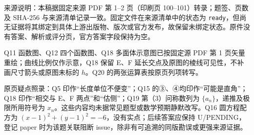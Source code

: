 

\begin{gktip}
来源说明：本稿据固定来源 PDF 第 1–2 页（印刷页 100–101）转录；题签、页数及 SHA-256 与来源清单记录一致。固定文件在来源清单中的状态为 \texttt{ready}，但尚无证据将其绑定到具体上游出版物、版次或官方发布，故保留未绑定状态。原件没有答案、解析或评分页，官方答案字段保持为空。

Q11 函数图、Q12 四个函数图、Q18 多面体示意图已按固定源 PDF 第 1 页矢量重绘；曲线比例仅作示意，Q18 保留 E、F 延长交点及原图的棱线可见性，不补画尺寸箭头或原图未标的 $h$。Q20 的两张运算表按原页列项转写。

原页疑点照录：Q5 印作“长度单位不便变”；Q15 的③、④均印作“可能是直角”；Q18 印作“相交与 E、F 两点”和“估侧”；Q19 第（3）问称数列为 \(\{a_n\}\)，递推及极限所用符号为 \(x_n\)。这些内容均未据常见题型或数学预期静默改写。Q16 圆方程配方为 \((x-1)^2+(y-1)^2=-6\)，没有实点；后续答案应保持 U/PENDING，登记 paper 时为该题关联阻断 issue，除非有可追溯的同版勘误或更强来源证据。
\end{gktip}


